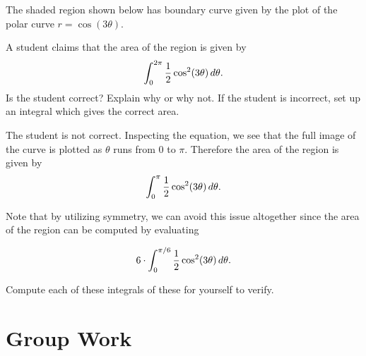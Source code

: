 \documentclass[noauthor,handout]{ximera}
\begin{document}
\begin{problem}
The shaded region shown below has boundary curve given by the plot of the polar curve $r = \cos(3\theta)$. 

\begin{image}  
\end{image} 

A student claims that the area of the region is given by 
$$
\int_0^{2\pi} \frac{1}{2} \cos^2(3\theta) \mathop{}\!d \theta.
$$
Is the student correct? Explain why or why not. If the student is incorrect, set up an integral which gives the correct area.

\begin{freeResponse}
The student is not correct. Inspecting the equation, we see that the full image of the curve is plotted as $\theta$ runs from $0$ to $\pi$. Therefore the area of the region is given by 
$$
\int_0^{\pi} \frac{1}{2} \cos^2(3\theta) \mathop{}\!d \theta.
$$

Note that by utilizing symmetry, we can avoid this issue altogether since the area of the region can be computed by evaluating

$$
6 \cdot \int_0^{\pi/6} \frac{1}{2} \cos^2(3\theta) \mathop{}\!d \theta.
$$

Compute each of these integrals of these for yourself to verify.
\end{freeResponse}
\end{problem}

\section{Group Work}
\end{document}
